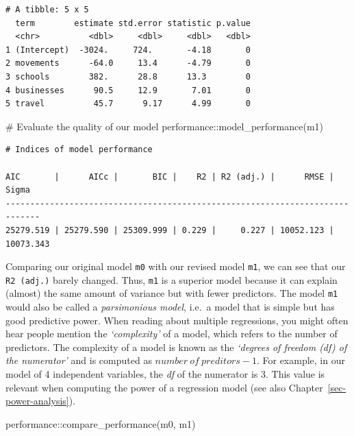\documentclass[
  letterpaper,
]{krantz}
\makeatletter
\newenvironment{Shaded}{\begin{snugshade}}{\end{snugshade}}
\newcommand{\CommentTok}[1]{\textcolor[rgb]{0.37,0.37,0.37}{#1}}
\newcommand{\FunctionTok}[1]{\textcolor[rgb]{0.28,0.35,0.67}{#1}}
\newcommand{\NormalTok}[1]{\textcolor[rgb]{0.00,0.23,0.31}{#1}}
\newcommand{\SpecialCharTok}[1]{\textcolor[rgb]{0.37,0.37,0.37}{#1}}
\newenvironment{kframe}{%
\medskip{}
\setlength{\fboxsep}{.8em}
 \def\at@end@of@kframe{}%
 \ifinner\ifhmode%
  \def\at@end@of@kframe{\end{minipage}}%
  \begin{minipage}{\columnwidth}%
 \fi\fi%
 \def\FrameCommand##1{\hskip\@totalleftmargin \hskip-\fboxsep
 \colorbox{shadecolor}{##1}\hskip-\fboxsep
     \hskip-\linewidth \hskip-\@totalleftmargin \hskip\columnwidth}%
 \MakeFramed {\advance\hsize-\width
   \@totalleftmargin\z@ \linewidth\hsize
   \@setminipage}}%
 {\par\unskip\endMakeFramed%
 \at@end@of@kframe}
\renewenvironment{Shaded}{\begin{kframe}}{\end{kframe}}
\makeatother
\begin{document}
\begin{verbatim}
# A tibble: 5 x 5
  term        estimate std.error statistic p.value
  <chr>          <dbl>     <dbl>     <dbl>   <dbl>
1 (Intercept)  -3024.     724.       -4.18       0
2 movements      -64.0     13.4      -4.79       0
3 schools        382.      28.8      13.3        0
4 businesses      90.5     12.9       7.01       0
5 travel          45.7      9.17      4.99       0
\end{verbatim}

\begin{Shaded}
\begin{Highlighting}[]
\CommentTok{\# Evaluate the quality of our model}
\NormalTok{performance}\SpecialCharTok{::}\FunctionTok{model\_performance}\NormalTok{(m1)}
\end{Highlighting}
\end{Shaded}

\begin{verbatim}
# Indices of model performance

AIC       |      AICc |       BIC |    R2 | R2 (adj.) |      RMSE |     Sigma
-----------------------------------------------------------------------------
25279.519 | 25279.590 | 25309.999 | 0.229 |     0.227 | 10052.123 | 10073.343
\end{verbatim}

Comparing our original model \texttt{m0} with our revised model
\texttt{m1}, we can see that our \texttt{R2\ (adj.)} barely changed.
Thus, \texttt{m1} is a superior model because it can explain (almost)
the same amount of variance but with fewer predictors. The model
\texttt{m1} would also be called a \emph{parsimonious model}, i.e.~a
model that is simple but has good predictive power. When reading about
multiple regressions, you might often hear people mention the
\emph{`complexity'} of a model, which refers to the number of
predictors. The complexity of a model is known as the \emph{`degrees of
freedom (df) of the numerator'} and is computed as
\(number\ of\ preditors - 1\). For example, in our model of 4
independent variables, the \emph{df} of the numerator is 3. This value
is relevant when computing the power of a regression model (see also
Chapter~\ref{sec-power-analysis}).

\begin{Shaded}
\begin{Highlighting}[]
\NormalTok{performance}\SpecialCharTok{::}\FunctionTok{compare\_performance}\NormalTok{(m0, m1)}
\end{Highlighting}
\end{Shaded}
\end{document}
